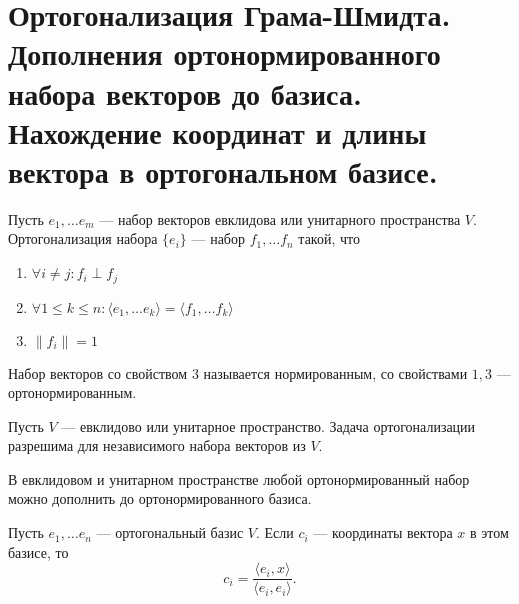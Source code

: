 \section{Ортогонализация Грама-Шмидта. Дополнения ортонормированного набора векторов до базиса. Нахождение координат и длины вектора в ортогональном базисе.}
\begin{defn} 
    Пусть $ e_1, \ldots e_m$ --- набор векторов евклидова или унитарного пространства $ V$.  {\sf Ортогонализация} набора $ \{e_i\}$ --- набор $ f_1, \ldots f_n$ такой, что
    \begin{enumerate}[noitemsep]
        \item $\forall i \ne j\colon  f_i \perp f_j$
	\item $ \forall 1 \le k \le n\colon \langle e_1, \ldots e_k \rangle = \langle f_1, \ldots f_k \rangle$ 
	\item $ \| f_i \| = 1$
    \end{enumerate} 
    Набор векторов со свойством $ 3$ называется  {\sf нормированным}, со свойствами $ 1, 3$ --- ортонормированным.  
\end{defn}
\begin{thm}
    Пусть $ V$ --- евклидово или унитарное пространство. Задача ортогонализации разрешима для независимого набора векторов из $ V$.
\end{thm}

\begin{cor}
    В евклидовом и унитарном пространстве любой ортонормированный набор можно дополнить до ортонормированного базиса.
\end{cor}
\begin{st}
    Пусть $ e_1, \ldots e_n$ --- ортогональный базис $ V$. Если  $ c_i$ --- координаты вектора  $ x$ в этом базисе, то
     \[
	 c_i  = \frac{\langle e_i, x \rangle}{\langle e_i, e_i \rangle}
    .\] 
\end{st}

